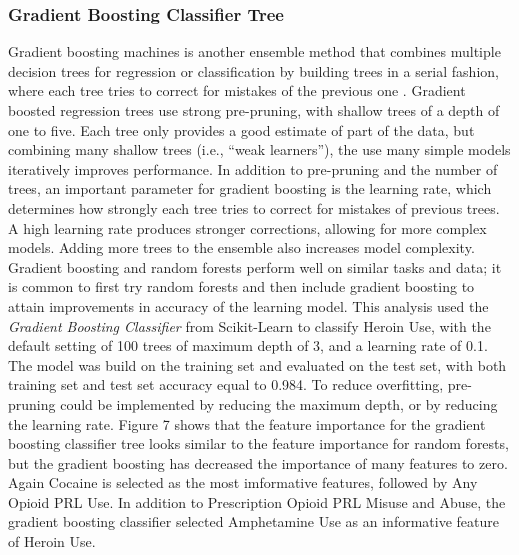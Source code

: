 \documentclass[sigconf]{acmart}
\begin{document}
\subsubsection{Gradient Boosting Classifier Tree}

Gradient boosting machines is another ensemble method that combines multiple
decision trees for regression or classification by building trees in a serial 
fashion, where each tree tries to correct for mistakes of the previous one
\cite{muller17}. Gradient boosted regression trees use strong pre-pruning, 
with shallow trees of a depth of one to five. Each tree only provides a good
estimate of part of the data, but combining many shallow trees (i.e., ``weak 
learners''), the use many simple models iteratively improves performance. In 
addition to pre-pruning and the number of trees, an important parameter for 
gradient boosting is the learning rate, which determines how strongly each
tree tries to correct for mistakes of previous trees. A high learning rate
produces stronger corrections, allowing for more complex models. Adding
more trees to the ensemble also increases model complexity. Gradient boosting
and random forests perform well on similar tasks and data; it is common to
first try random forests and then include gradient boosting to attain 
improvements in accuracy of the learning model. This analysis used the 
\emph{Gradient Boosting Classifier} from Scikit-Learn to classify Heroin Use, 
with the default setting of 100 trees of maximum depth of 3, and a learning 
rate of 0.1. The model was build on the training set and evaluated on the test 
set, with both training set and test set accuracy equal to 0.984. To reduce
overfitting, pre-pruning could be implemented by reducing the maximum depth, 
or by reducing the learning rate. Figure 7 shows that the feature importance 
for the gradient boosting classifier tree looks similar to the feature 
importance for random forests, but the gradient boosting has decreased the 
importance of many features to zero. Again Cocaine is selected as the most 
imformative features, followed by Any Opioid PRL Use. In addition to 
Prescription Opioid PRL Misuse and Abuse, the gradient boosting classifier 
selected Amphetamine Use as an informative feature of Heroin Use. 
\end{document}
